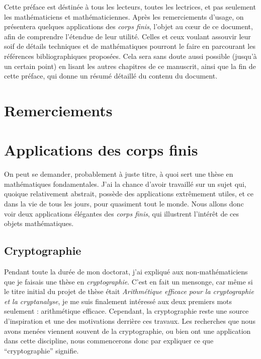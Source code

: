 Cette préface est déstinée à tous les lecteurs, toutes les lectrices, et pas
seulement les mathématiciens et mathématiciennes. Après les remerciements
d'usage, on présentera quelques applications des \emph{corps finis}, l'objet au
cœur de ce document, afin de comprendre l'étendue de leur utilité. Celles et ceux
voulant assouvir leur soif de détails techniques et de mathématiques
pourront le faire en parcourant les références bibliographiques proposées. Cela
sera sans doute aussi possible (jusqu'à un certain point) en lisant les autres
chapitres de ce manuscrit, ainsi que la fin de cette préface, qui donne un
résumé détaillé du contenu du document.

\minitoc
%
\clearpage

\section*{Remerciements}

\clearpage
\section*{Applications des corps finis}

On peut se demander, probablement à juste titre, à quoi sert une thèse en
mathématiques fondamentales. J'ai la chance d'avoir travaillé sur un sujet qui,
quoique relativement abstrait, possède des applications extrêmement utiles, et
ce dans la vie de tous les jours, pour quasiment tout le monde. Nous allons donc
voir deux applications élégantes des \emph{corps finis}, qui illustrent
l'intérêt de ces objets mathématiques.

\subsection*{Cryptographie}
\label{sec:crypto}

Pendant toute la durée de mon doctorat, j'ai expliqué aux non-mathématiciens que
je faisais une thèse en \emph{cryptographie}. C'est en fait un mensonge, car
même si le titre initial du projet de thèse était \emph{Arithmétique efficace
pour la cryptographie et la cryptanalyse}, je me suis finalement intéressé
aux deux premiers mots seulement : arithmétique efficace. Cependant, la
cryptographie reste une source d'inspiration et une des motivations derrière ces
travaux. Les recherches que nous avons menées viennent souvent de la
cryptographie, ou bien ont une application dans cette discipline, nous
commencerons donc par expliquer ce que ``cryptographie'' signifie.


